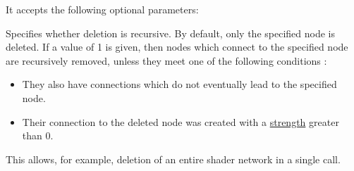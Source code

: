 \documentclass[oneside,ebook]{memoir}
\newcommand{\paramlistitemTN}[2]{\item[#2\textcolor{lightgray}{\dotfill}#1]}
\newcommand{\paramlistitemTND}[3]{\paramlistitemTN{#1 {\rmfamily({\ttfamily#3})}}{#2}}
\begin{document}
It accepts the following optional parameters:
\begin{paramlist}
\paramlistitemTND{int}{recursive}{0}
Specifies whether deletion is recursive.
By default, only the specified node is deleted.
If a value of 1 is given, then nodes which connect to the specified node are recursively removed, unless they meet one of the following conditions :
\begin{itemize}
\item They also have connections which do not eventually lead to the specified node.
\item Their connection to the deleted node was created with a \hyperref[CAPI:nsiconnect]{strength} greater than 0.
\end{itemize}
This allows, for example, deletion of an entire shader network in a single call.
\end{paramlist}
\end{document}

